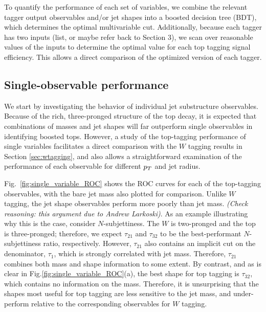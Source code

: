 To quantify the performance of each set of variables, we combine the relevant tagger output observables and/or jet shapes into a boosted decision tree (BDT), which determines the optimal multivariable cut. Additionally, because each tagger has two inputs (list, or maybe refer back to Section 3), we scan over reasonable values of the inputs to determine the optimal value for each top tagging signal efficiency. This allows  a direct comparison of the optimized version of each tagger. 

\subsection{Single-observable performance}
We start by investigating the behavior of individual jet substructure observables. Because of the rich, three-pronged structure of the top decay, it is expected that combinations of masses and jet shapes will far outperform single observables in identifying boosted tops. However, a study of the top-tagging performance of single variables facilitates a direct comparison with the $W$ tagging results in Section \ref{sec:wtagging}, and also allows a straightforward examination of the performance of each observable for different $p_T$ and jet radius.

Fig.~\ref{fig:single_variable_ROC} shows the ROC curves for each of the top-tagging observables, with the bare jet mass also plotted for comparison. Unlike $W$ tagging, the jet shape observables perform more poorly than jet mass. \emph{(Check reasoning: this argument due to Andrew Larkoski)}. As an example illustrating why this is the case, consider $N$-subjettiness. The $W$ is two-pronged and the top is three-pronged; therefore, we expect $\tau_{21}$ and $\tau_{32}$ to be the best-performant $N$-subjettiness ratio, respectively. However, $\tau_{21}$ also contains an implicit cut on the denominator, $\tau_1$, which is strongly correlated with jet mass. Therefore, $\tau_{21}$ combines both mass and shape information to some extent. By contrast, and as is clear in Fig.\ref{fig:single_variable_ROC}(a), the best shape for top tagging is $\tau_{32}$, which contains no information on the mass. Therefore, it is  unsurprising that the  shapes most useful for top tagging are less sensitive to the jet mass, and under-perform relative to the corresponding observables for $W$ tagging.

